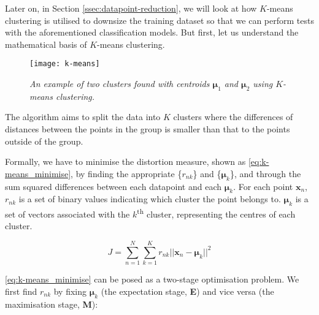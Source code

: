 Later on, in Section \ref{ssec:datapoint-reduction}, we will look at how $K$-means clustering is utilised to downsize the training dataset so that we can perform tests with the aforementioned classification models. But first, let us understand the mathematical basis of $K$-means clustering.

\begin{figure}[H]
  \centering
  \texttt{[image: k-means]}
  \caption{\textit{An example of two clusters found with centroids $\mathbf{\mu}_1$ and $\mathbf{\mu}_2$ using $K$-means clustering.}}
  \label{fig:k-means}
\end{figure}

The algorithm aims to split the data into $K$ clusters where the differences of distances between the points in the group is smaller than that to the points outside of the group. 

Formally, we have to minimise the distortion measure, shown as \autoref{eq:k-means_minimise}, by finding the appropriate \{$r_{nk}$\} and \{$\mathbf{\mu}_k$\}, and through the sum squared differences between each datapoint and each $\mathbf{\mu}_k$. For each point $\mathbf{x}_n$, $r_{nk}$ is a set of binary values indicating which cluster the point belongs to. $\mathbf{\mu}_k$ is a set of vectors associated with the $k$\textsuperscript{th} cluster, representing the centres of each cluster. 

\begin{equation} \label{eq:k-means_minimise}
  J = \sum_{n=1}^{N} \sum_{k=1}^{K} r_{nk}||\mathbf{x}_n - \mathbf{\mu}_k||^2
\end{equation}

\autoref{eq:k-means_minimise} can be posed as a two-stage optimisation problem. We first find $r_{nk}$ by fixing $\mathbf{\mu}_k$ (the expectation stage, \textbf{E}) and vice versa (the maximisation stage, \textbf{M}):

